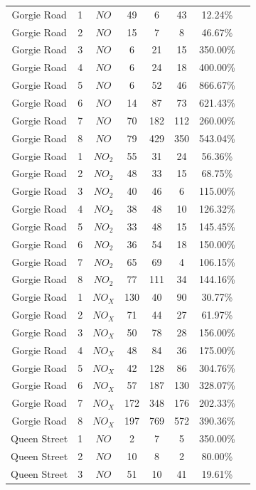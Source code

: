 \begin{longtable}{|c|c|c|c|c|c|c|c|}
				Gorgie Road & 1 & $NO$ & 49 & 6 & 43 & 12.24\% \\
				Gorgie Road & 2 & $NO$ & 15 & 7 & 8 & 46.67\% \\
				Gorgie Road & 3 & $NO$ & 6 & 21 & 15 & 350.00\% \\
				Gorgie Road & 4 & $NO$ & 6 & 24 & 18 & 400.00\% \\
				Gorgie Road & 5 & $NO$ & 6 & 52 & 46 & 866.67\% \\
				Gorgie Road & 6 & $NO$ & 14 & 87 & 73 & 621.43\% \\
				Gorgie Road & 7 & $NO$ & 70 & 182 & 112 & 260.00\% \\
				Gorgie Road & 8 & $NO$ & 79 & 429 & 350 & 543.04\% \\
				Gorgie Road & 1 & $NO_{2}$ & 55 & 31 & 24 & 56.36\% \\
				Gorgie Road & 2 & $NO_{2}$ & 48 & 33 & 15 & 68.75\% \\
				Gorgie Road & 3 & $NO_{2}$ & 40 & 46 & 6 & 115.00\% \\
				Gorgie Road & 4 & $NO_{2}$ & 38 & 48 & 10 & 126.32\% \\
				Gorgie Road & 5 & $NO_{2}$ & 33 & 48 & 15 & 145.45\% \\
				Gorgie Road & 6 & $NO_{2}$ & 36 & 54 & 18 & 150.00\% \\
				Gorgie Road & 7 & $NO_{2}$ & 65 & 69 & 4 & 106.15\% \\
				Gorgie Road & 8 & $NO_{2}$ & 77 & 111 & 34 & 144.16\% \\
				Gorgie Road & 1 & $NO_{X}$ & 130 & 40 & 90 & 30.77\% \\
				Gorgie Road & 2 & $NO_{X}$ & 71 & 44 & 27 & 61.97\% \\
				Gorgie Road & 3 & $NO_{X}$ & 50 & 78 & 28 & 156.00\% \\
				Gorgie Road & 4 & $NO_{X}$ & 48 & 84 & 36 & 175.00\% \\
				Gorgie Road & 5 & $NO_{X}$ & 42 & 128 & 86 & 304.76\% \\
				Gorgie Road & 6 & $NO_{X}$ & 57 & 187 & 130 & 328.07\% \\
				Gorgie Road & 7 & $NO_{X}$ & 172 & 348 & 176 & 202.33\% \\
				Gorgie Road & 8 & $NO_{X}$ & 197 & 769 & 572 & 390.36\% \\
				Queen Street & 1 & $NO$ & 2 & 7 & 5 & 350.00\% \\
				Queen Street & 2 & $NO$ & 10 & 8 & 2 & 80.00\% \\
				Queen Street & 3 & $NO$ & 51 & 10 & 41 & 19.61\% \\

\end{longtable}
